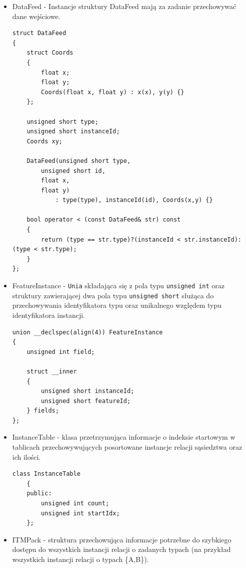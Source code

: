 \documentclass[12pt]{article}
\newcounter{operator}
\begin{document}
\begin{itemize}
\item DataFeed - Instancje struktury DataFeed mają za zadanie przechowywać dane wejściowe.

\begin{minipage}{\linewidth}
\begin{lstlisting}[caption={Kod struktury DataFeed}]
struct DataFeed
{
    struct Coords
    {
        float x;
        float y;
        Coords(float x, float y) : x(x), y(y) {}
    };
    
	unsigned short type;
	unsigned short instanceId;
	Coords xy;
    
	DataFeed(unsigned short type,
        unsigned short id,
        float x,
        float y)
    		: type(type), instanceId(id), Coords(x,y) {}

	bool operator < (const DataFeed& str) const
	{
		return (type == str.type)?(instanceId < str.instanceId):(type < str.type);
	}
};
\end{lstlisting}
\end{minipage}

\item FeatureInstance - \lstinline{Unia} składająca się z pola typu \lstinline{unsigned int} oraz struktury zawierającej dwa pola typu \lstinline{unsigned short} służąca do przechowywania identyfikatora typu oraz unikalnego względem typu identyfikatora instancji.

\begin{lstlisting}
union __declspec(align(4)) FeatureInstance
{
	unsigned int field;

	struct __inner
	{
		unsigned short instanceId;
		unsigned short featureId;
	} fields;
};
\end{lstlisting}

\item InstanceTable - klasa przetrzymująca informacje o indeksie startowym w tablicach przechowywujących posortowane instancje relacji sąsiedztwa oraz ich ilości. 

\begin{minipage}{\linewidth}
\begin{lstlisting}[caption={Kod klasy InstanceTable}]
	class InstanceTable
	{
	public:
		unsigned int count;
		unsigned int startIdx;
	};
\end{lstlisting}
\end{minipage}

\item ITMPack - struktura przechowująca informacje potrzebne do szybkiego dostępu do wszystkich instancji relacji o zadanych typach (na przykład wszystkich instancji relacji o typach \{A,B\}).


\end{itemize}
\end{document}

